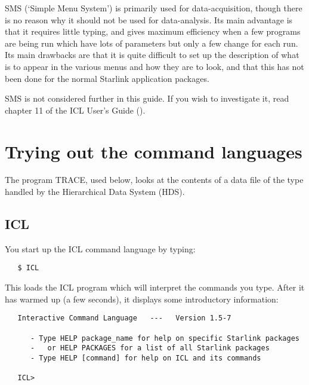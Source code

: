 SMS (`Simple Menu System') is primarily used for data-acquisition, though
there is no reason why it should not be used for data-analysis.
Its main advantage is that it requires little typing, and gives maximum
efficiency when a few programs are being run which have lots of
parameters but only a few change for each run.
Its main drawbacks are that it is quite difficult to set up the description of
what is to appear in the various menus and how they are to look, and that this
has not been done for the normal Starlink application packages.

SMS is not considered further in this guide.
If you wish to investigate it, read chapter 11 of the ICL User's Guide
().

\section{Trying out the command languages}
\label{S_trycl}

The program TRACE, used below, looks at the contents of a data file of the
type handled by the Hierarchical Data System (HDS).

\subsection{ICL}

You start up the ICL command language by typing:

\begin{small}
\begin{verbatim}
   $ ICL
\end{verbatim}
\end{small}

This loads the ICL program which will interpret the commands you type.
After it has warmed up (a few seconds), it displays some introductory
information:

\begin{small}
\begin{verbatim}
   Interactive Command Language   ---   Version 1.5-7

      - Type HELP package_name for help on specific Starlink packages
      -   or HELP PACKAGES for a list of all Starlink packages
      - Type HELP [command] for help on ICL and its commands

   ICL>
\end{verbatim}
\end{small}

